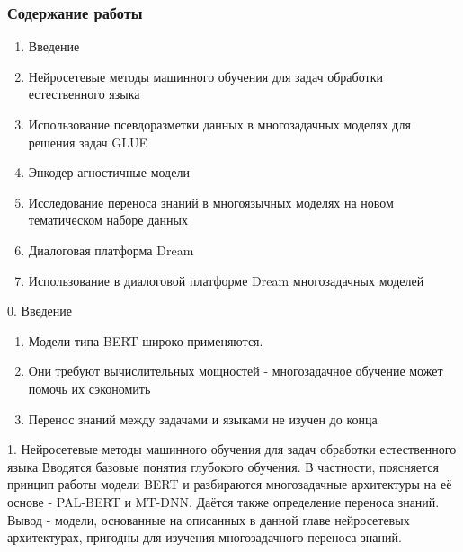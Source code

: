 \begin{frame}
\frametitle{Содержание работы}
\begin{enumerate}
    \item {Введение}
    \item {Нейросетевые методы машинного обучения для задач обработки естественного языка}
    \item {Использование псевдоразметки данных в многозадачных моделях для решения задач GLUE}
    \item {Энкодер-агностичные модели}
    \item {Исследование переноса знаний в многоязычных моделях на новом тематическом наборе данных}
    \item {Диалоговая платформа Dream}
    \item {Использование в диалоговой платформе {Dream} многозадачных моделей}
\end{enumerate}
\end{frame}

\begin{frame}{0. Введение}
\begin{enumerate}
\item Модели типа BERT широко применяются.
\item Они требуют вычислительных мощностей - многозадачное обучение может помочь их сэкономить
\item Перенос знаний между задачами и языками не изучен до конца
\end{enumerate}
\end{frame}

\begin{frame}{1. Нейросетевые методы машинного обучения  для задач обработки естественного языка}
Вводятся базовые понятия глубокого обучения. В частности, поясняется принцип работы модели BERT и разбираются многозадачные архитектуры на её основе - PAL-BERT и MT-DNN. Даётся также определение переноса знаний.
\newline
\newline
Вывод - модели, основанные на описанных в данной главе нейросетевых архитектурах, пригодны для изучения многозадачного переноса знаний.
\end{frame}

